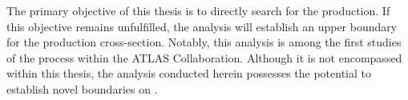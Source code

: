 

The primary objective of this thesis is to directly search for the \tHq production. 
If this objective remains unfulfilled, the analysis will establish an upper boundary 
for the production cross-section. Notably, this analysis is among the first studies 
of the \tHq process within the ATLAS Collaboration. 
Although it is not encompassed within this thesis, the analysis conducted herein 
possesses the potential to establish novel boundaries on \yt.


\begin{comment}






\end{comment}
